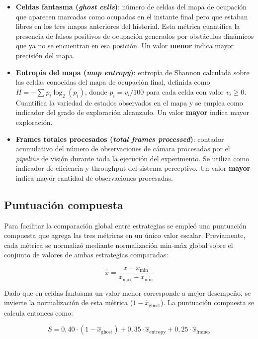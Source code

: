 \begin{itemize}
    \item \textbf{Celdas fantasma (\textit{ghost cells})}: número de celdas del mapa de ocupación que aparecen marcadas como ocupadas en el instante final pero que estaban libres en los tres mapas anteriores del historial. Esta métrica cuantifica la presencia de falsos positivos de ocupación generados por obstáculos dinámicos que ya no se encuentran en esa posición. Un valor \textbf{menor} indica mayor precisión del mapa.
    \item \textbf{Entropía del mapa (\textit{map entropy})}: entropía de Shannon calculada sobre las celdas conocidas del mapa de ocupación final, definida como $H = -\sum p_i \log_2(p_i)$, donde $p_i = v_i / 100$ para cada celda con valor $v_i \geq 0$. Cuantifica la variedad de estados observados en el mapa y se emplea como indicador del grado de exploración alcanzado. Un valor \textbf{mayor} indica mayor exploración.
    \item \textbf{Frames totales procesados (\textit{total frames processed})}: contador acumulativo del número de observaciones de cámara procesadas por el \textit{pipeline} de visión durante toda la ejecución del experimento. Se utiliza como indicador de eficiencia y throughput del sistema perceptivo. Un valor \textbf{mayor} indica mayor cantidad de observaciones procesadas.
\end{itemize}

\subsection{Puntuación compuesta}%
\label{sec:exp_score}

Para facilitar la comparación global entre estrategias se empleó una puntuación compuesta que agrega las tres métricas en un único valor escalar. Previamente, cada métrica se normalizó mediante normalización min-máx global sobre el conjunto de valores de ambas estrategias comparadas:

\begin{equation}
    \hat{x} = \frac{x - x_{\min}}{x_{\max} - x_{\min}}%
    \label{eq:norm}
\end{equation}

\noindent Dado que en celdas fantasma un valor menor corresponde a mejor desempeño, se invierte la normalización de esta métrica ($1 - \hat{x}_{\text{ghost}}$). La puntuación compuesta se calcula entonces como:

\begin{equation}
    S = 0{,}40 \cdot (1 - \hat{x}_{\text{ghost}}) + 0{,}35 \cdot \hat{x}_{\text{entropy}} + 0{,}25 \cdot \hat{x}_{\text{frames}}%
    \label{eq:score}
\end{equation}

